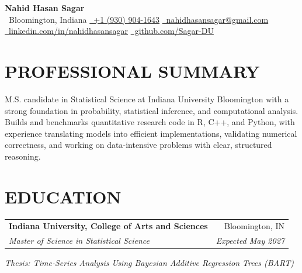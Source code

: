\documentclass[10pt,letterpaper]{article}
\makeatletter
\newcommand{\resumeEntry}[4]{%
	\begin{tabularx}{\textwidth}{@{}Xr@{}}
		\textbf{#1} & #2 \\
		\textit{#3} & \textit{#4}
	\end{tabularx}%
}
\newcommand{\contactsep}{\qquad}
\makeatother
\begin{document}
\normalsize

\begin{center}
	{\LARGE
	 \textbf{Nahid Hasan Sagar}}\\[2.2pt]

	{\footnotesize
		\faMapMarker*\, Bloomington, Indiana
		\contactsep
		\href{tel:+19309041643}{\faPhone*\, +1 (930) 904-1643}
		\contactsep
		\href{mailto:nahidhasansagar@gmail.com}{\faEnvelope\, nahidhasansagar@gmail.com}
	}\\[-0.2pt]

	{\footnotesize
		\href{https://www.linkedin.com/in/nahidhasansagar/}{\faLinkedinIn\, linkedin.com/in/nahidhasansagar}
		\contactsep
		\href{https://github.com/Sagar-DU}{\faGithub\, github.com/Sagar-DU}
	}
\end{center}

\vspace{-5pt}

\section*{PROFESSIONAL SUMMARY}

M.S. candidate in Statistical Science at Indiana University Bloomington with a strong foundation in probability, statistical inference, and computational analysis. Builds and benchmarks quantitative research code in R, C++, and Python, with experience translating models into efficient implementations, validating numerical correctness, and working on data-intensive problems with clear, structured reasoning.

\section*{EDUCATION}

\resumeEntry
	{Indiana University, College of Arts and Sciences}
	{Bloomington, IN}
	{Master of Science in Statistical Science}
	{Expected May 2027}

\vspace{0.4pt}

\textit{Thesis: Time-Series Analysis Using Bayesian Additive Regression Trees (BART)}
\end{document}
